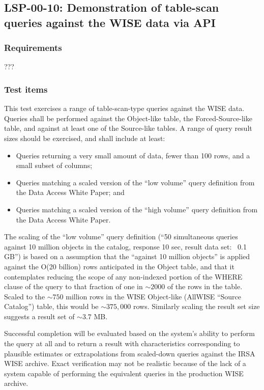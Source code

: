 \subsection{LSP-00-10: Demonstration of table-scan queries against the WISE data via API}
\label{lsp-00-10}

\subsubsection{Requirements}

???

\subsubsection{Test items}

This test exercises a range of table-scan-type queries against the WISE data.
Queries shall be performed against the Object-like table, the Forced-Source-like table, and against at least one of the Source-like tables.
A range of query result sizes should be exercised, and shall include at least:

\begin{itemize}

  \item{Queries returning a very small amount of data, fewer than 100 rows, and a small subset of columns;}
  \item{Queries matching a scaled version of the ``low volume'' query definition from the Data Access White Paper; and}
  \item{Queries matching a scaled version of the ``high volume'' query definition from the Data Access White Paper.}

\end{itemize}

The scaling of the ``low volume'' query definition (``50 simultaneous queries against 10 million objects in the catalog, response 10 sec, result data set: ~0.1 GB'') is based on a assumption that the ``against 10 million objects'' is applied against the O(20 billion) rows anticipated in the Object table,
and that it contemplates reducing the scope of any non-indexed portion of the WHERE clause of the query to that fraction of one in $\sim 2000$ of the rows in the table.
Scaled to the $\sim 750$ million rows in the WISE Object-like (AllWISE ``Source Catalog'') table, this would be $\sim 375,000$ rows.
Similarly scaling the result set size suggests a result set of $\sim 3.7$ MB.

Successful completion will be evaluated based on the system's ability to perform the query at all and to return a result with characteristics corresponding to plausible estimates or extrapolations from scaled-down queries against the IRSA WISE archive.
Exact verification may not be realistic because of the lack of a system capable of performing the equivalent queries in the production WISE archive.

